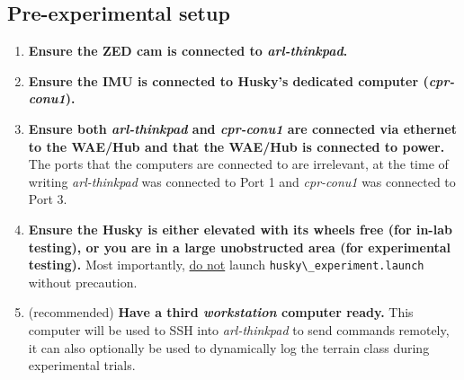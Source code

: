 \documentclass[
	12pt, %
]{fphw}
\newcommand{\code}[1]{\colorbox{light-gray}{\lstinline|#1|}}
\begin{document}
\subsection{Pre-experimental setup}
\begin{enumerate}
\item \textbf{Ensure the ZED cam is connected to \emph{arl-thinkpad}.}

\item \textbf{Ensure the IMU is connected to Husky's dedicated computer (\emph{cpr-conu1}).}

\item \textbf{Ensure both \emph{arl-thinkpad} and \emph{cpr-conu1} are connected via ethernet to the WAE/Hub and that the WAE/Hub is connected to power.} The ports that the computers are connected to are irrelevant, at the time of writing \emph{arl-thinkpad} was connected to Port 1 and \emph{cpr-conu1} was connected to Port 3.

\item \textbf{Ensure the Husky is either elevated with its wheels free (for in-lab testing), or you are in a large unobstructed area (for experimental testing).} Most importantly, \underline{do not} launch \code{husky\_experiment.launch} without precaution.

\item (recommended) \textbf{Have a third \emph{workstation} computer ready.} This computer will be used to SSH into \emph{arl-thinkpad} to send commands remotely, it can also optionally be used to dynamically log the terrain class during experimental trials.
  
\end{enumerate}
  
\end{document}
